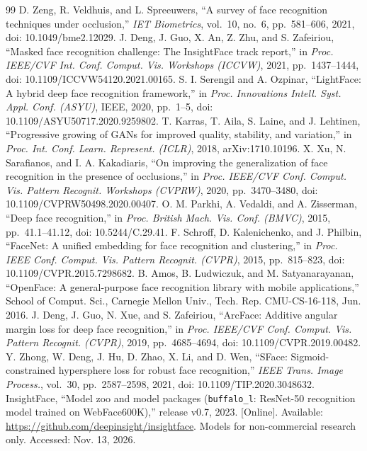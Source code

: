 \begin{thebibliography}{99}
 D. Zeng, R. Veldhuis, and L. Spreeuwers, ``A survey of face recognition techniques under occlusion,'' \textit{IET Biometrics}, vol.~10, no.~6, pp.~581--606, 2021, doi: 10.1049/bme2.12029.
 J. Deng, J. Guo, X. An, Z. Zhu, and S. Zafeiriou, ``Masked face recognition challenge: The InsightFace track report,'' in \textit{Proc. IEEE/CVF Int. Conf. Comput. Vis. Workshops (ICCVW)}, 2021, pp.~1437--1444, doi: 10.1109/ICCVW54120.2021.00165.
 S. I. Serengil and A. Ozpinar, ``LightFace: A hybrid deep face recognition framework,'' in \textit{Proc. Innovations Intell. Syst. Appl. Conf. (ASYU)}, IEEE, 2020, pp.~1--5, doi: 10.1109/ASYU50717.2020.9259802.
 T. Karras, T. Aila, S. Laine, and J. Lehtinen, ``Progressive growing of GANs for improved quality, stability, and variation,'' in \textit{Proc. Int. Conf. Learn. Represent. (ICLR)}, 2018, arXiv:1710.10196.
 X. Xu, N. Sarafianos, and I. A. Kakadiaris, ``On improving the generalization of face recognition in the presence of occlusions,'' in \textit{Proc. IEEE/CVF Conf. Comput. Vis. Pattern Recognit. Workshops (CVPRW)}, 2020, pp.~3470--3480, doi: 10.1109/CVPRW50498.2020.00407.
 O. M. Parkhi, A. Vedaldi, and A. Zisserman, ``Deep face recognition,'' in \textit{Proc. British Mach. Vis. Conf. (BMVC)}, 2015, pp.~41.1--41.12, doi: 10.5244/C.29.41.
 F. Schroff, D. Kalenichenko, and J. Philbin, ``FaceNet: A unified embedding for face recognition and clustering,'' in \textit{Proc. IEEE Conf. Comput. Vis. Pattern Recognit. (CVPR)}, 2015, pp.~815--823, doi: 10.1109/CVPR.2015.7298682.
 B. Amos, B. Ludwiczuk, and M. Satyanarayanan, ``OpenFace: A general-purpose face recognition library with mobile applications,'' School of Comput. Sci., Carnegie Mellon Univ., Tech. Rep. CMU-CS-16-118, Jun. 2016.
 J. Deng, J. Guo, N. Xue, and S. Zafeiriou, ``ArcFace: Additive angular margin loss for deep face recognition,'' in \textit{Proc. IEEE/CVF Conf. Comput. Vis. Pattern Recognit. (CVPR)}, 2019, pp.~4685--4694, doi: 10.1109/CVPR.2019.00482.
 Y. Zhong, W. Deng, J. Hu, D. Zhao, X. Li, and D. Wen, ``SFace: Sigmoid-constrained hypersphere loss for robust face recognition,'' \textit{IEEE Trans. Image Process.}, vol.~30, pp.~2587--2598, 2021, doi: 10.1109/TIP.2020.3048632.
 InsightFace, ``Model zoo and model packages (\texttt{buffalo\_l}: ResNet-50 recognition model trained on WebFace600K),'' release v0.7, 2023. [Online]. Available: \url{https://github.com/deepinsight/insightface}. Models for non-commercial research only. Accessed: Nov. 13, 2026.

\end{thebibliography}
